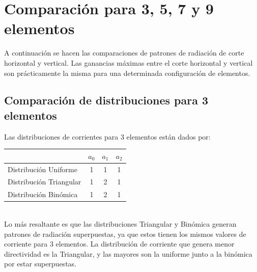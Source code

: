 \documentclass[11pt]{report}
\begin{document}
\section{Comparación para 3, 5, 7 y 9 elementos}

A continuación se hacen las comparaciones de patrones de radiación de corte horizontal y vertical. Las ganancias máximas entre el corte horizontal y vertical son prácticamente la misma para una determinada configuración de elementos.

\newpage

\subsection{Comparación de distribuciones para 3 elementos}

Las distribuciones de corrientes para 3 elementos están dados por:

\begin{tabular}{l|c|c|c}
	& $a_0$ & $a_1$ & $a_2$ \\ \hline
	Distribución Uniforme 	& 1 & 1 & 1  \\
	Distribución Triangular & 1 & 2 & 1  \\
	Distribución Binómica 	& 1 & 2 & 1  \\
\end{tabular}\\
 
Lo más resaltante es que las distribuciones Triangular y Binómica generan patrones de radiación superpuestas, ya que estos tienen los mismos valores de corriente para 3 elementos. 
La distribución de corriente que genera menor directividad es la Triangular, y las mayores son la uniforme junto a la binómica por estar superpuestas. 
\end{document}
